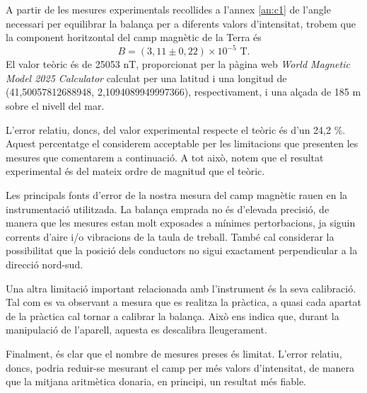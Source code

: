 \documentclass[a4paper,10.5pt]{report}
\begin{document}
A partir de les mesures experimentals recollides a l'annex \ref{an:c1} de l'angle necessari per equilibrar la balança per a diferents valors d'intensitat, trobem que la component horitzontal del camp magnètic de la Terra és
\begin{equation*}
	B=(3,11 \pm 0,22)\times 10^{-5} \text{ T}.
\end{equation*}
El valor teòric és de 25053 nT, proporcionat per la pàgina web \textit{World Magnetic Model 2025 Calculator}\cite{ref2} calculat per una latitud i una longitud de (41,50057812688948, 2,1094089949997366), respectivament, i una alçada de 185 m sobre el nivell del mar. 

L'error relatiu, doncs, del valor experimental respecte el teòric és d'un 24,2 \%. Aquest percentatge el considerem acceptable per les limitacions que presenten les mesures que comentarem a continuació. A tot això, notem que el resultat experimental és del mateix ordre de magnitud que el teòric.

Les principals fonts d'error de la nostra mesura del camp magnètic rauen en la instrumentació utilitzada. La balança emprada no és d'elevada precisió, de manera que les mesures estan molt exposades a mínimes pertorbacions, ja siguin corrents d'aire i/o vibracions de la taula de treball. També cal considerar la possibilitat que la posició dels conductors no sigui exactament perpendicular a la direcció nord-sud.

Una altra limitació important relacionada amb l'instrument és la seva calibració. Tal com es va observant a mesura que es realitza la pràctica, a quasi cada apartat de la pràctica cal tornar a calibrar la balança. Això ens indica que, durant la manipulació de l'aparell, aquesta es descalibra lleugerament.

Finalment, és clar que el nombre de mesures preses és limitat. L'error relatiu, doncs, podria reduir-se mesurant el camp per més valors d'intensitat, de manera que la mitjana aritmètica donaria, en principi, un resultat més fiable.
\end{document}
